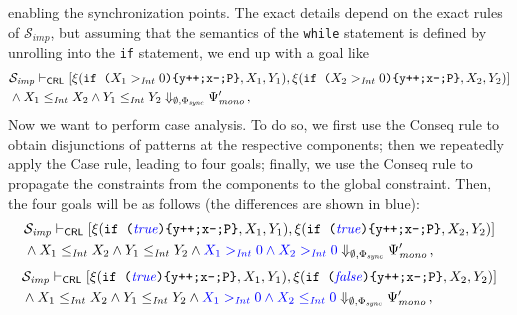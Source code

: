 enabling the synchronization points.
The exact details depend on the exact rules of $\mathcal{S}_{\mathit{imp}}$, but assuming that the semantics of
the \texttt{while} statement is defined by unrolling into the \texttt{if} statement,
we end up with a goal like
\begin{align*}
  & \mathcal{S}_{\mathit{imp}} \vdash_{\mathsf{CRL}}
  [ \xi(\texttt{if (}X_1 >_{\mathit{Int}} 0 \texttt{)\{y++;x--;P\}}, X_1, Y_1),  
    \xi(\texttt{if (}X_2 >_{\mathit{Int}} 0 \texttt{)\{y++;x--;P\}}, X_2, Y_2) ] \\
  & \land X_1 \leq_{\mathit{Int}} X_2 \land Y_1 \leq_{\mathit{Int}} Y_2
  \Downarrow_{\emptyset, \Phi_{\mathit{sync}}} \Psi^\prime_{\mathit{mono}} \, ,
\end{align*}
Now we want to perform case analysis. To do so, we first use the Conseq rule to
obtain disjunctions of patterns at the respective components;
then we repeatedly apply the Case rule, leading to four goals;
finally, we use the Conseq rule to propagate the constraints from the components to the global constraint.
Then, the four goals will be as follows
(the differences are shown in {\color{blue}blue}):
\begin{equation}\label{ex:case1}
\begin{aligned}
  & \mathcal{S}_{\mathit{imp}} \vdash_{\mathsf{CRL}}
  [ \xi(\texttt{if (}{\color{blue}\mathit{true}}\texttt{)\{y++;x--;P\}}, X_1, Y_1),  
    \xi(\texttt{if (}{\color{blue}\mathit{true}}\texttt{)\{y++;x--;P\}}, X_2, Y_2) ] \\
  & \land X_1 \leq_{\mathit{Int}} X_2 \land Y_1 \leq_{\mathit{Int}} Y_2 \land {\color{blue} X_1 >_{\mathit{Int}} 0 \land X_2 >_{\mathit{Int}} 0 }
  \Downarrow_{\emptyset, \Phi_{\mathit{sync}}} \Psi^\prime_{\mathit{mono}} \, ,
\end{aligned}
\end{equation}
\begin{equation}\label{ex:case2}
\begin{aligned}
  & \mathcal{S}_{\mathit{imp}} \vdash_{\mathsf{CRL}}
  [ \xi(\texttt{if (}{\color{blue}\mathit{true}}\texttt{)\{y++;x--;P\}}, X_1, Y_1),  
    \xi(\texttt{if (}{\color{blue}\mathit{false}}\texttt{)\{y++;x--;P\}}, X_2, Y_2) ] \\
  & \land X_1 \leq_{\mathit{Int}} X_2 \land Y_1 \leq_{\mathit{Int}} Y_2 \land {\color{blue} X_1 >_{\mathit{Int}} 0 \land X_2 \leq_{\mathit{Int}} 0 }
  \Downarrow_{\emptyset, \Phi_{\mathit{sync}}} \Psi^\prime_{\mathit{mono}} \, ,
\end{aligned}
\end{equation}
